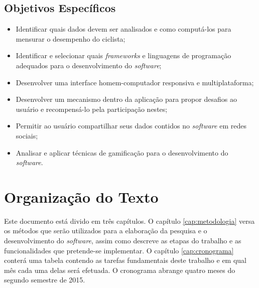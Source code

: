 \subsection{Objetivos Específicos}
\begin{itemize}
\item Identificar quais dados devem ser analisados e como computá-los para mensurar o desempenho do ciclista;
\item Identificar e selecionar quais \textit{frameworks} e linguagens de programação adequados para o desenvolvimento do \textit{software};
\item Desenvolver uma interface homem-computador responsiva e multiplataforma;
\item Desenvolver um mecanismo dentro da aplicação para propor desafios ao usuário e recompensá-lo pela participação nestes;
\item Permitir ao usuário compartilhar seus dados contidos no \textit{software} em redes sociais;
\item Analisar e aplicar técnicas de gamificação para o desenvolvimento do \textit{software}.
\end{itemize}

\section{Organização do Texto}
Este documento está divido em três capítulos. O capítulo \ref{cap:metodologia} versa os métodos que serão utilizados para a elaboração da pesquisa e o desenvolvimento do \textit{software}, assim como descreve as etapas do trabalho e as funcionalidades que pretende-se implementar. O capítulo \ref{cap:cronograma} conterá uma tabela contendo as tarefas fundamentais deste trabalho e em qual mês cada uma delas será efetuada.
O cronograma abrange quatro meses do segundo semestre de 2015.

